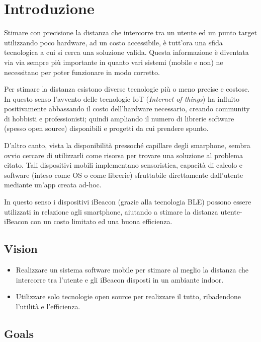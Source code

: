 \chapter{Introduzione}
	Stimare con precisione la distanza che intercorre tra un utente ed un punto target utilizzando poco hardware, ad un costo accessibile, è tutt'ora una sfida tecnologica a cui si cerca una soluzione valida. Questa informazione è diventata via via sempre più importante in quanto vari sistemi (mobile e non) ne necessitano per poter funzionare in modo corretto. 
	
	Per stimare la distanza esistono diverse tecnologie più o meno precise e costose. In questo senso l'avvento delle tecnologie IoT (\textit{Internet of things}) ha influito positivamente abbassando il costo dell'hardware necessario, creando community di hobbisti e professionisti; quindi ampliando il numero di librerie software (spesso open source) disponibili e progetti da cui prendere spunto.
	
	D'altro canto, vista la disponibilità pressoché capillare degli smarphone, sembra ovvio cercare di utilizzarli come risorsa per trovare una soluzione al problema citato. Tali dispositivi mobili implementano sensoristica, capacità di calcolo e software (inteso come OS o come librerie) sfruttabile direttamente dall'utente mediante un'app creata ad-hoc.
	
	In questo senso i dispositivi iBeacon (grazie alla tecnologia BLE) possono essere utilizzati in relazione agli smartphone, aiutando a stimare la distanza utente-iBeacon con un costo limitato ed una buona efficienza.
	
\section{Vision}

\begin{itemize}
	\item Realizzare un sistema software mobile per stimare al meglio la distanza che intercorre tra l'utente e gli iBeacon disposti in un ambiante indoor.
	
	\item Utilizzare solo tecnologie open source per realizzare il tutto, ribadendone l'utilità e l'efficienza.
\end{itemize}

\section{Goals}
